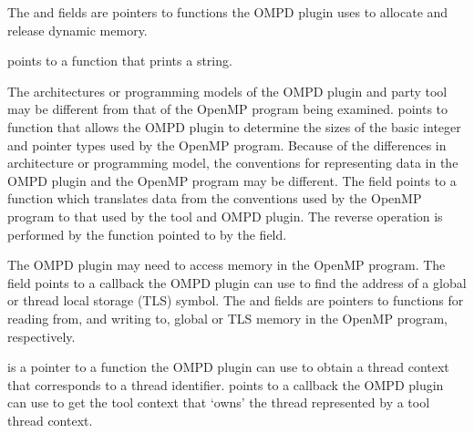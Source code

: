 The  and  fields are
pointers to functions the OMPD plugin uses to allocate and release
dynamic memory.

 points to a function that prints a string.

The architectures or programming models of the OMPD plugin and
party tool may be different from that of the OpenMP
program being examined.
 points to function that allows
the OMPD plugin to determine the sizes of the basic integer
and pointer types used by the OpenMP program.
Because of the differences in architecture or programming model,
the conventions for representing data in the OMPD plugin and
the OpenMP program may be different.
The  field points to a function which translates
data from the conventions used by the OpenMP program to that used
by the tool and OMPD plugin.
The reverse operation is performed by the function pointed
to by the  field.

The OMPD plugin may need to access memory in the OpenMP program.
The  field points to a callback the
OMPD plugin can use to find the address of a global or thread
local storage (TLS) symbol.
The  and  fields are
pointers to functions for reading from, and writing to, global or TLS
memory in the OpenMP program, respectively.

 is a pointer to a function
the OMPD plugin can use to obtain a thread context that corresponds to
a thread identifier.
 points to a callback
the OMPD plugin can use to get the tool context that `owns' the
thread represented by a tool thread context.

